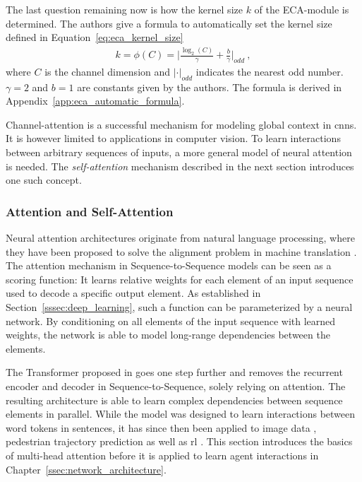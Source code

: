 The last question remaining now is how the kernel size $k$ of the ECA-module is determined. The authors give a formula to automatically set the kernel size defined in Equation~\ref{eq:eca_kernel_size}
\begin{gather}\label{eq:eca_kernel_size}
    k = \phi (C) = \bigg| \frac{\log_2 (C)}{\gamma} + \frac{b}{\gamma} \bigg|_{odd}~, 
\end{gather}
where $C$ is the channel dimension and $| \cdot |_{odd}$ indicates the nearest odd number. $\gamma = 2$ and $b=1$ are constants given by the authors. The formula is derived in Appendix~\ref{app:eca_automatic_formula}.

Channel-attention is a successful mechanism for modeling global context in \glspl{cnn}. It is however limited to applications in computer vision. To learn interactions between arbitrary sequences of inputs, a more general model of neural attention is needed. The \emph{self-attention} mechanism described in the next section introduces one such concept.


\subsubsection{Attention and Self-Attention}\label{sssec:attention}
Neural attention architectures originate from natural language processing, where they have been proposed to solve the alignment problem in machine translation \cite{bahdanauNeuralMachineTranslation2016}. The attention mechanism in Sequence-to-Sequence models can be seen as a scoring function: It learns relative weights for each element of an input sequence used to decode a specific output element. As established in Section~\ref{sssec:deep_learning}, such a function can be parameterized by a neural network. By conditioning on all elements of the input sequence with learned weights, the network is able to model long-range dependencies between the elements.

The Transformer proposed in \cite{vaswaniAttentionAllYou2017} goes one step further and removes the recurrent encoder and decoder in Sequence-to-Sequence, solely relying on attention. The resulting architecture is able to learn complex dependencies between sequence elements in parallel. While the model was designed to learn interactions between word tokens in sentences, it has since then been applied to image data \cite{dosovitskiyIMAGEWORTH16X162021a}, pedestrian trajectory prediction \cite{everettCollisionAvoidancePedestrianRich2020} as well as \gls{rl} \cite{wrightNeuralAttentionalArchitecturesDeep}. This section introduces the basics of multi-head attention before it is applied to learn agent interactions in Chapter~\ref{ssec:network_architecture}.

